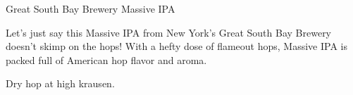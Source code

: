 \begin{recipie}{Great South Bay Brewery Massive IPA}

\begin{aboutblock}
Let's just say this Massive IPA from New York's Great South Bay Brewery doesn't skimp
on the hops! With a hefty dose of flameout hops, Massive IPA is packed full of American
hop flavor and aroma.
\end{aboutblock}


\begin{methodandtiming}
 
\begin{mashsteps}
\end{mashsteps}

\begin{directions}
Dry hop at high krausen.
\end{directions}

\end{methodandtiming}

\pagebreak

\begin{ingredientsblock}

\begin{malts}
\end{malts}

\begin{hops}
\end{hops}

\begin{yeasts}
\end{yeasts}

\end{ingredientsblock}

\end{recipie}

